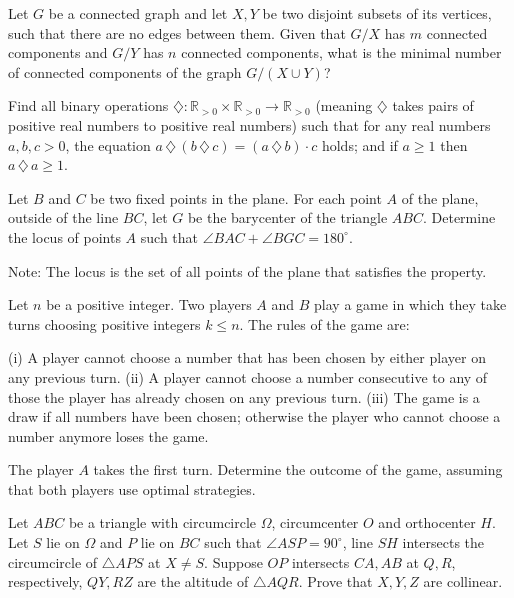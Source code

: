 \documentclass[11pt]{scrartcl}
\begin{document}
\begin{problem}[8612979541975584705]
	Let $G$ be a connected graph and let $X, Y$ be two disjoint subsets of its vertices, such that there are no edges between them. Given that $G/X$ has $m$ connected components and $G/Y$ has $n$ connected components, what is the minimal number of connected components of the graph $G/(X \cup Y)$?
\end{problem}
\begin{problem}[2694660444585153591]
Find all binary operations $\diamondsuit: \mathbb R_{>0}\times \mathbb R_{>0}\to \mathbb R_{>0}$ (meaning $\diamondsuit$ takes pairs of positive real numbers to positive real numbers) such that for any real numbers $a, b, c > 0$,
the equation $a\,\diamondsuit\, (b\,\diamondsuit \,c) = (a\,\diamondsuit \,b)\cdot c$ holds; and
if $a\ge 1$ then $a\,\diamondsuit\, a\ge 1$.
\end{problem}
\begin{problem}[2143833415170817930]
Let $B$ and $C$ be two fixed points in the plane. For each point $A$ of the plane, outside of the line $BC$, let $G$ be the barycenter of the triangle $ABC$. Determine the locus of points $A$ such that $\angle BAC + \angle BGC = 180^{\circ}$.

Note: The locus is the set of all points of the plane that satisfies the property.
\end{problem}
\begin{problem}[14852916670686]
Let $n$ be a positive integer. Two players $A$ and $B$ play a game in which they take turns choosing positive integers $k \le n$. The rules of the game are:

(i) A player cannot choose a number that has been chosen by either player on any previous turn.
(ii) A player cannot choose a number consecutive to any of those the player has already chosen on any previous turn.
(iii) The game is a draw if all numbers have been chosen; otherwise the player who cannot choose a number anymore loses the game.

The player $A$ takes the first turn. Determine the outcome of the game, assuming that both players use optimal strategies.
\end{problem}
\begin{problem}[3417358984411200361]
Let $ABC$ be a triangle with circumcircle $\Omega$, circumcenter $O$ and orthocenter $H$. Let $S$ lie on $\Omega$ and $P$ lie on $BC$ such that $\angle ASP=90^\circ$, line $SH$ intersects the circumcircle of $\triangle APS$ at $X\neq S$. Suppose $OP$ intersects $CA,AB$ at $Q,R$, respectively, $QY,RZ$ are the altitude of $\triangle AQR$. Prove that $X,Y,Z$ are collinear.
\end{problem}
\end{document}
